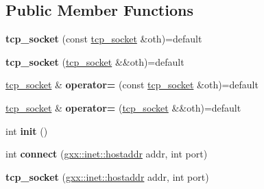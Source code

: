 \subsection*{Public Member Functions}
\begin{DoxyCompactItemize}
\item 
{\bfseries tcp\+\_\+socket} (const \hyperlink{structgxx_1_1inet_1_1tcp__socket}{tcp\+\_\+socket} \&oth)=default\hypertarget{structgxx_1_1inet_1_1tcp__socket_abf0b3464bb01c9766840b9ae3130eede}{}\label{structgxx_1_1inet_1_1tcp__socket_abf0b3464bb01c9766840b9ae3130eede}

\item 
{\bfseries tcp\+\_\+socket} (\hyperlink{structgxx_1_1inet_1_1tcp__socket}{tcp\+\_\+socket} \&\&oth)=default\hypertarget{structgxx_1_1inet_1_1tcp__socket_ab2f751a7c984889b3467e8ea24ee6535}{}\label{structgxx_1_1inet_1_1tcp__socket_ab2f751a7c984889b3467e8ea24ee6535}

\item 
\hyperlink{structgxx_1_1inet_1_1tcp__socket}{tcp\+\_\+socket} \& {\bfseries operator=} (const \hyperlink{structgxx_1_1inet_1_1tcp__socket}{tcp\+\_\+socket} \&oth)=default\hypertarget{structgxx_1_1inet_1_1tcp__socket_abcfd6ae0a29927ddce390f106ce3160e}{}\label{structgxx_1_1inet_1_1tcp__socket_abcfd6ae0a29927ddce390f106ce3160e}

\item 
\hyperlink{structgxx_1_1inet_1_1tcp__socket}{tcp\+\_\+socket} \& {\bfseries operator=} (\hyperlink{structgxx_1_1inet_1_1tcp__socket}{tcp\+\_\+socket} \&\&oth)=default\hypertarget{structgxx_1_1inet_1_1tcp__socket_a76c768bb90e3a3a10931a67db0d16c68}{}\label{structgxx_1_1inet_1_1tcp__socket_a76c768bb90e3a3a10931a67db0d16c68}

\item 
int {\bfseries init} ()\hypertarget{structgxx_1_1inet_1_1tcp__socket_a41f956a13a7fef7fa9413e37a17e5b09}{}\label{structgxx_1_1inet_1_1tcp__socket_a41f956a13a7fef7fa9413e37a17e5b09}

\item 
int {\bfseries connect} (\hyperlink{classgxx_1_1hostaddr}{gxx\+::inet\+::hostaddr} addr, int port)\hypertarget{structgxx_1_1inet_1_1tcp__socket_a679fc13e82a785a93df8fefab0c0f627}{}\label{structgxx_1_1inet_1_1tcp__socket_a679fc13e82a785a93df8fefab0c0f627}

\item 
{\bfseries tcp\+\_\+socket} (\hyperlink{classgxx_1_1hostaddr}{gxx\+::inet\+::hostaddr} addr, int port)\hypertarget{structgxx_1_1inet_1_1tcp__socket_af2678df2a3fdf89bb3809dc09106b5fc}{}\label{structgxx_1_1inet_1_1tcp__socket_af2678df2a3fdf89bb3809dc09106b5fc}


\end{DoxyCompactItemize}
